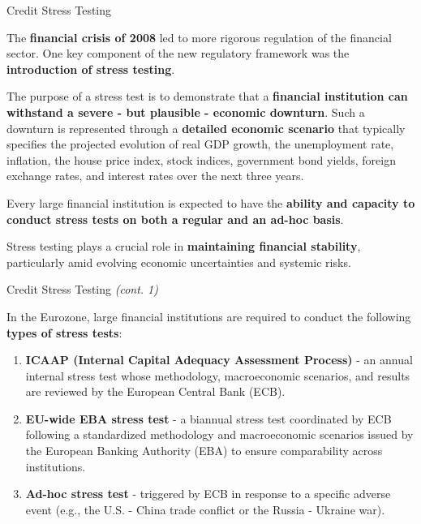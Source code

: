 \documentclass{beamer}
\begin{document}
\begin{frame}{Credit Stress Testing}
\justifying
\small

The \textbf{financial crisis of 2008} led to more rigorous regulation of the financial sector. One key component of the new regulatory framework was the \textbf{introduction of stress testing}.

\medskip

The purpose of a stress test is to demonstrate that a \textbf{financial institution can withstand a severe - but plausible - economic downturn}. Such a downturn is represented through a \textbf{detailed economic scenario} that typically specifies the projected evolution of real GDP growth, the unemployment rate, inflation, the house price index, stock indices, government bond yields, foreign exchange rates, and interest rates over the next three years.

\medskip

Every large financial institution is expected to have the \textbf{ability and capacity to conduct stress tests on both a regular and an ad-hoc basis}.

\medskip

Stress testing plays a crucial role in \textbf{maintaining financial stability}, particularly amid evolving economic uncertainties and systemic risks.

\end{frame}

\begin{frame}{Credit Stress Testing \textit{(cont. 1)}}
\justifying
\small

In the Eurozone, large financial institutions are required to conduct the following \textbf{types of stress tests}:
\begin{enumerate}
\item \textbf{ICAAP (Internal Capital Adequacy Assessment Process)} - an annual internal stress test whose methodology, macroeconomic scenarios, and results are reviewed by the European Central Bank (ECB).
\item \textbf{EU-wide EBA stress test} - a biannual stress test coordinated by ECB following a standardized methodology and macroeconomic scenarios issued by the European Banking Authority (EBA) to ensure comparability across institutions.
\item \textbf{Ad-hoc stress test} - triggered by ECB in response to a specific adverse event (e.g., the U.S. - China trade conflict or the Russia - Ukraine war).
\end{enumerate}

\end{frame}
\end{document}
